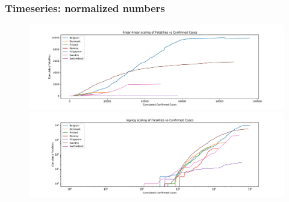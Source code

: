 \documentclass{beamer}
\begin{document}
\begin{frame}
\frametitle{Timeseries: normalized numbers}
\begin{figure}[H]
\includegraphics[width=\textwidth]{../figs/parametric_deaths_confirmed_linear.pdf}
\includegraphics[width=\textwidth]{../figs/parametric_deaths_confirmed_log.pdf}
\end{figure}
\end{frame}
\end{document}

